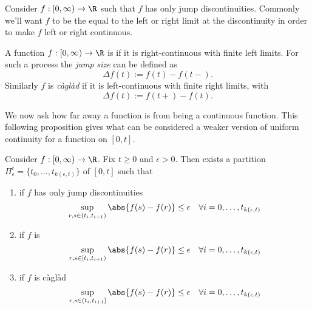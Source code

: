 \documentclass{scrreprt}
\theoremstyle{remark}
\newcommand{\caglad}{c\`agl\`ad}
\newcommand\defeq{:=}
\begin{document}
Consider $f: [0, \infty) \to \R$ such that $f$ has only jump discontinuities. Commonly we'll want $f$ to be the equal to the left or right limit at the discontinuity in order to make $f$ left or right continuous.

\begin{defn}
	A function $f: [0, \infty) \to \R$ is \emph{\cadlag{}} if it is right-continuous with finite left limits. For such a process the \emph{jump size} can be defined as
	\begin{equation}
		\Delta f(t) \defeq f(t) - f(t-).
	\end{equation}
	Similarly $f$ is \emph{c\`agl\`ad} if it is left-continuous with finite right limits, with
	\begin{equation}
		\Delta f(t) \defeq f(t+) - f(t).
	\end{equation}
\end{defn}

We now ask how far away a \cadlag{} function is from being a continuous function. This following proposition gives what can be considered a weaker version of uniform continuity for a \cadlag{} function on $[0, t]$.

\begin{prop}
	\label{prop:jump-mesh}
	Consider $f: [0, \infty) \to \R$. Fix $t \geq 0$ and $\epsilon > 0$. Then exists a partition $\Pi_{\epsilon}^t = \{t_0, \ldots, t_{k(\epsilon, t)}\}$ of $[0, t]$ such that
	\begin{enumerate}
		\item if $f$ has only jump discontinuities
			\begin{equation}
				\label{eq:part-condition}
				\sup_{r, s \in (t_i, t_{i+1})} \abs{f(s) - f(r)} \leq \epsilon
				\quad \forall i = 0, \ldots, t_{k(\epsilon, t)}
			\end{equation}
		\item if $f$ is \cadlag{}
			\begin{equation}
				\sup_{r, s \in [t_i, t_{i+1})} \abs{f(s) - f(r)} \leq \epsilon
				\quad \forall i = 0, \ldots, t_{k(\epsilon, t)}
			\end{equation}
		\item if $f$ is \caglad{}
			\begin{equation}
				\sup_{r, s \in (t_i, t_{i+1}]} \abs{f(s) - f(r)} \leq \epsilon
				\quad \forall i = 0, \ldots, t_{k(\epsilon, t)}
			\end{equation}
	\end{enumerate}
\end{prop}
\end{document}
